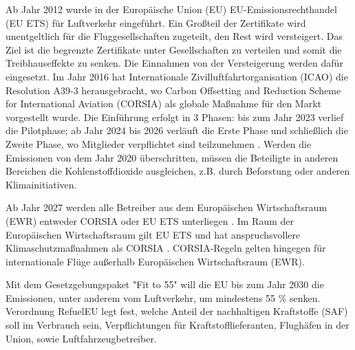 Ab Jahr 2012 wurde in der Europäische Union (EU) EU-Emissionsrechthandel (EU ETS) für Luftverkehr eingeführt.
Ein Großteil der Zertifikate wird unentgeltlich für die Fluggesellschaften zugeteilt, den Rest wird versteigert. 
Das Ziel ist die begrenzte Zertifikate unter Gesellschaften zu verteilen und somit die Treibhauseffekte zu senken.
Die Einnahmen von der Versteigerung werden dafür eingesetzt.\cite{conrady2019luftverkehr}
Im Jahr 2016 hat Internationale Zivilluftfahrtorganisation (ICAO) die Resolution A39-3 herausgebracht, 
wo Carbon Offsetting and Reduction Scheme for International Aviation (CORSIA) als globale Maßnahme für den Markt vorgestellt wurde. 
Die Einführung erfolgt in 3 Phasen: 
bis zum Jahr 2023 verlief die Pilotphase; ab Jahr 2024 bis 2026 verläuft die Erste Phase und schließlich die Zweite Phase, wo Mitglieder verpflichtet sind 
teilzunehmen \cite{conrady2019luftverkehr}. 
Werden die Emissionen von dem Jahr 2020 überschritten, müssen die Beteiligte in anderen Bereichen die Kohlenstoffdioxide ausgleichen, z.B.
durch Beforstung oder anderen Klimainitiativen. 

Ab Jahr 2027 werden alle Betreiber aus dem Europäischen Wirtschaftsraum (EWR) entweder CORSIA oder EU ETS unterliegen \cite{uba_aviation_2023}.
Im Raum der Europäischen Wirtschaftsraum gilt EU ETS und hat anspruchsvollere Klimaschutzmaßnahmen als CORSIA \cite{uba_aviation_2023}.
CORSIA-Regeln gelten hingegen für internationale Flüge außerhalb Europäischen Wirtschaftsraum (EWR).

Mit dem Gesetzgebungspaket "Fit to 55" will die EU bis zum Jahr 2030 die Emissionen, unter anderem vom Luftverkehr, um mindestens 55 \% senken.
Verordnung RefuelEU legt fest, welche Anteil der nachhaltigen Kraftstoffe (SAF) soll im Verbrauch sein, Verpflichtungen für 
Kraftstofflieferanten, Flughäfen in der Union, sowie Luftfahrzeugbetreiber.
